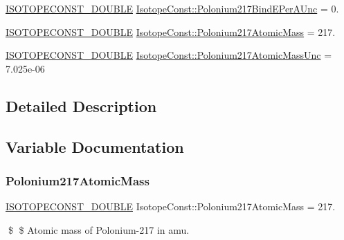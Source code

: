 \begin{DoxyCompactItemize}
\mbox{\hyperlink{group___isotope_const-_macros_ga8f45a7272ce02c0b4c65c44636ed719a}{I\+S\+O\+T\+O\+P\+E\+C\+O\+N\+S\+T\+\_\+\+D\+O\+U\+B\+LE}} \mbox{\hyperlink{group___isotope_const-_polonium-_po217_ga703737d21cbd6f7cd1d70714bfbf2b78}{Isotope\+Const\+::\+Polonium217\+Bind\+E\+Per\+A\+Unc}} = 0.
\item 
\mbox{\hyperlink{group___isotope_const-_macros_ga8f45a7272ce02c0b4c65c44636ed719a}{I\+S\+O\+T\+O\+P\+E\+C\+O\+N\+S\+T\+\_\+\+D\+O\+U\+B\+LE}} \mbox{\hyperlink{group___isotope_const-_polonium-_po217_ga530c65069acd6ab4ba1c0a9e8eb7d120}{Isotope\+Const\+::\+Polonium217\+Atomic\+Mass}} = 217.
\item 
\mbox{\hyperlink{group___isotope_const-_macros_ga8f45a7272ce02c0b4c65c44636ed719a}{I\+S\+O\+T\+O\+P\+E\+C\+O\+N\+S\+T\+\_\+\+D\+O\+U\+B\+LE}} \mbox{\hyperlink{group___isotope_const-_polonium-_po217_ga7a9f5084c0465963149c425a91e19ae3}{Isotope\+Const\+::\+Polonium217\+Atomic\+Mass\+Unc}} = 7.\+025e-\/06
\end{DoxyCompactItemize}


\subsection{Detailed Description}


\subsection{Variable Documentation}
\mbox{\label{group___isotope_const-_polonium-_po217_ga530c65069acd6ab4ba1c0a9e8eb7d120}} 
\subsubsection{\texorpdfstring{Polonium217\+Atomic\+Mass}{Polonium217AtomicMass}}
{\footnotesize\ttfamily \mbox{\hyperlink{group___isotope_const-_macros_ga8f45a7272ce02c0b4c65c44636ed719a}{I\+S\+O\+T\+O\+P\+E\+C\+O\+N\+S\+T\+\_\+\+D\+O\+U\+B\+LE}} Isotope\+Const\+::\+Polonium217\+Atomic\+Mass = 217.}

\$ \$ Atomic mass of Polonium-\/217 in amu. \mbox{\label{group___isotope_const-_polonium-_po217_ga7a9f5084c0465963149c425a91e19ae3}} 

